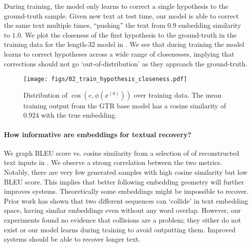\documentclass[11pt]{article}
\begin{document}

During training, the model only learns to correct a single hypothesis to the ground-truth sample. Given new text at test time, our model is able to correct the same text multiple times, ``pushing'' the text from $0.9$ embedding similarity to $1.0$. We plot the closeness of the first hypothesis to the ground-truth in the training data for the length-32 model  in . We see that during training the model learns to correct hypotheses across a wide range of closenesses, implying that corrections should not go `out-of-distribution' as they approach the ground-truth.

\begin{figure}[t]
    \centering
    \texttt{[image: figs/02\_train\_hypothesis\_closeness.pdf]}
    \caption{
    Distribution of $\cos(e, \phi(x^{(0)}))$ over training data. The mean training output from the GTR base model has a cosine similarity of $0.924$ with the true embedding.
    }
    \label{fig:02_hypothesis_closeness}
\end{figure}



\paragraph{How informative are embeddings for textual recovery? }
We graph BLEU score vs. cosine similarity from a selection of of reconstructed text inputs in . We observe a strong correlation between the two metrics. Notably, there are very few generated samples with high cosine similarity but low BLEU score. This implies that better following embedding geometry will further improves  systems.
Theoretically some embeddings might be impossible to recover. Prior work \cite{song2020adversarial, morris2020secondorder} has shown that two different sequences can `collide' in text embedding space, having similar embeddings even without any word overlap.
However, our experiments found no evidence that collisions are a problem; they either do not exist or our model learns during training to avoid outputting them. Improved systems should be able to recover longer text.
\end{document}
